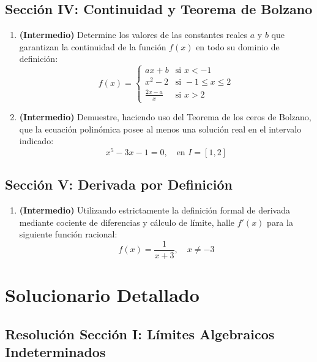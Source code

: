 \documentclass[11pt,letterpaper]{article}
\begin{document}
\subsection{Sección IV: Continuidad y Teorema de Bolzano}
\begin{enumerate}[label=\textbf{\arabic*.}]
    \setcounter{enumerate}{\value{enumi}}
    \item \textbf{(Intermedio)} Determine los valores de las constantes reales $a$ y $b$ que garantizan la continuidad de la función $f(x)$ en todo su dominio de definición:
    $$f(x) = \begin{cases} 
        ax + b & \text{si } x < -1 \\ 
        x^2 - 2 & \text{si } -1 \leq x \leq 2 \\ 
        \frac{2x - a}{x} & \text{si } x > 2 
    \end{cases}$$
    
    \item \textbf{(Intermedio)} Demuestre, haciendo uso del Teorema de los ceros de Bolzano, que la ecuación polinómica posee al menos una solución real en el intervalo indicado:
    $$x^5 - 3x - 1 = 0, \quad \text{en } I = [1, 2]$$
\end{enumerate}

\subsection{Sección V: Derivada por Definición}
\begin{enumerate}[label=\textbf{\arabic*.}]
    \setcounter{enumerate}{\value{enumi}}
    \item \textbf{(Intermedio)} Utilizando estrictamente la definición formal de derivada mediante cociente de diferencias y cálculo de límite, halle $f'(x)$ para la siguiente función racional:
    $$f(x) = \frac{1}{x+3}, \quad x \neq -3$$
\end{enumerate}

\newpage

\section{Solucionario Detallado}

\subsection{Resolución Sección I: Límites Algebraicos Indeterminados}
\end{document}
